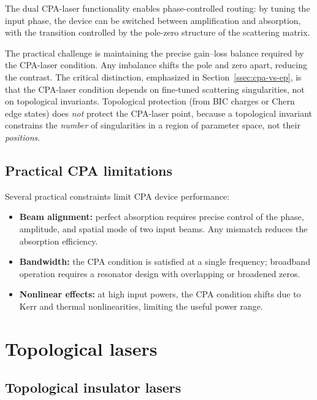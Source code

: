 The dual CPA-laser functionality enables phase-controlled routing: by
tuning the input phase, the device can be switched between amplification
and absorption, with the transition controlled by the pole-zero
structure of the scattering matrix.

The practical challenge is maintaining the precise gain--loss balance
required by the CPA-laser condition. Any imbalance shifts the pole
and zero apart, reducing the contrast. The critical distinction,
emphasized in Section~\ref{ssec:cpa-vs-ep}, is that the CPA-laser
condition depends on fine-tuned scattering singularities, not on
topological invariants. Topological protection (from BIC charges or
Chern edge states) does \emph{not} protect the CPA-laser point, because
a topological invariant constrains the \emph{number} of singularities in
a region of parameter space, not their \emph{positions}.

\subsection{Practical CPA limitations}
\label{ssec:cpa-limits}

Several practical constraints limit CPA device performance:
\begin{itemize}
 \item \textbf{Beam alignment:} perfect absorption requires precise
 control of the phase, amplitude, and spatial mode of two input
 beams. Any mismatch reduces the absorption efficiency.
 \item \textbf{Bandwidth:} the CPA condition is satisfied at a single
 frequency; broadband operation requires a resonator design with
 overlapping or broadened zeros.
 \item \textbf{Nonlinear effects:} at high input powers, the CPA
 condition shifts due to Kerr and thermal nonlinearities, limiting
 the useful power range.
\end{itemize}


\section{Topological lasers}
\label{sec:topo-lasers}

\subsection{Topological insulator lasers}
\label{ssec:topo-laser}

